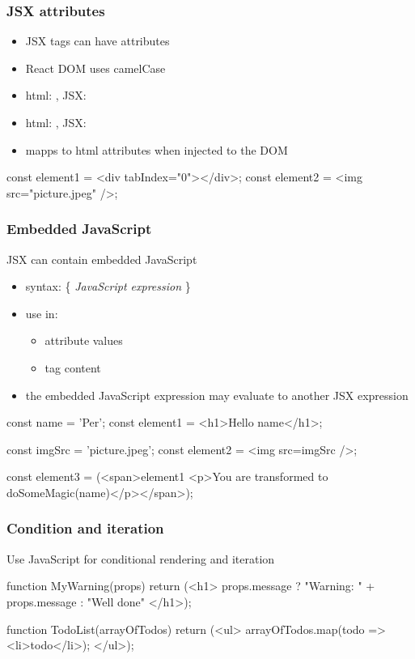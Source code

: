 \begin{frame}[fragile] \frametitle{JSX attributes}
\begin{itemize}
  \item JSX tags can have attributes
  \item React DOM uses camelCase
  \item html: , JSX: 
  \item html: , JSX: 
  \item mapps to html attributes when injected to the DOM
\end{itemize}

\vspace{8mm}
\begin{CodeBox}{}
const element1 = <div tabIndex="0"></div>;
const element2 = <img src="picture.jpeg" />;
\end{CodeBox}
\end{frame}

\begin{frame}[fragile] \frametitle{Embedded JavaScript}
JSX can contain embedded JavaScript
\begin{itemize}
  \item syntax: \{ \emph{JavaScript expression} \}
  \item use in:
  \begin{itemize}
    \item attribute values
    \item tag content
  \end{itemize}
  \item the embedded JavaScript expression may evaluate to another JSX expression
\end{itemize}
\vspace{3mm}
\begin{CodeBox}{}
const name = 'Per';
const element1 = <h1>Hello {name}</h1>;

const imgSrc = 'picture.jpeg';
const element2 = <img src={imgSrc} />;

const element3 = (<span>{element1}
  <p>You are transformed to {doSomeMagic(name)}</p></span>);
\end{CodeBox}
\end{frame}

\begin{frame}[fragile] \frametitle{Condition and iteration}
Use JavaScript for conditional rendering and iteration
\begin{CodeBox}{}
function MyWarning(props) {
  return (<h1>  {props.message ? 
             "Warning: " + props.message : "Well done" }
           </h1>);
}

function TodoList({arrayOfTodos}) {
  return (<ul>
              {arrayOfTodos.map(todo => <li>{todo}</li>)};
            </ul>);
}
\end{CodeBox}
\end{frame}

